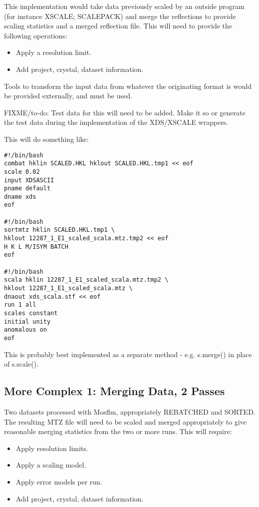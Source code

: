 \documentclass[a4paper, 11pt]{article}
\begin{document}
This implementation would take data previously scaled by an outside program
(for instance XSCALE; SCALEPACK) and merge the reflections to provide
scaling statistics and a merged reflection file. This will need to provide
the following operations:

\begin{itemize}
\item{Apply a resolution limit.}
\item{Add project, crystal, dataset information.}
\end{itemize}

Tools to transform the input data from whatever the originating format is
would be provided externally, and must be used.

FIXME/to-do: Test data for this will need to be added. Make it so or generate
the test data during the implementation of the XDS/XSCALE wrappers.

This will do something like:

{
\tiny
\begin{verbatim}
#!/bin/bash
combat hklin SCALED.HKL hklout SCALED.HKL.tmp1 << eof
scale 0.02
input XDSASCII
pname default
dname xds
eof

#!/bin/bash
sortmtz hklin SCALED.HKL.tmp1 \
hklout 12287_1_E1_scaled_scala.mtz.tmp2 << eof
H K L M/ISYM BATCH
eof

#!/bin/bash
scala hklin 12287_1_E1_scaled_scala.mtz.tmp2 \
hklout 12287_1_E1_scaled_scala.mtz \
dnaout xds_scala.stf << eof
run 1 all
scales constant
initial unity
anomalous on
eof
\end{verbatim}
}

This is probably best implemented as a separate method - e.g. s.merge() in 
place of s.scale().

\subsection{More Complex 1: Merging Data, 
2 Passes}

Two datasets processed with Mosflm, appropriately REBATCHED and SORTED. The
resulting MTZ file will need to be scaled and merged appropriately to give
reasonable merging statistics from the two or more runs. This will require:

\begin{itemize}
\item{Apply resolution limits.}
\item{Apply a scaling model.}
\item{Apply error models per run.}
\item{Add project, crystal, dataset information.}
\end{itemize}
\end{document}
